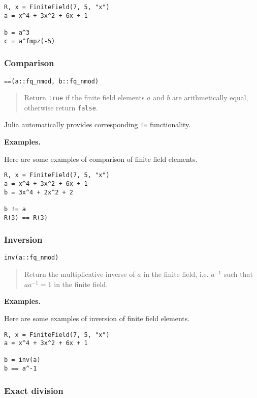 \documentclass[a4paper,10pt]{article}
\newcommand{\code}{\lstinline}
\newcommand{\desc}[1]{\vspace{-3mm}\begin{quote}#1\end{quote}}
\begin{document}
{{\begin{lstlisting}
R, x = FiniteField(7, 5, "x")
a = x^4 + 3x^2 + 6x + 1

b = a^3
c = a^fmpz(-5)
\end{lstlisting}

\subsubsection{Comparison}

\begin{lstlisting}
==(a::fq_nmod, b::fq_nmod)
\end{lstlisting}

\desc{Return \code{true} if the finite field elements $a$ and $b$ are 
arithmetically equal, otherwise return \code{false}.}

Julia automatically provides corresponding \code{!=} functionality.

\textbf{Examples.}

Here are some examples of comparison of finite field elements.

\begin{lstlisting}
R, x = FiniteField(7, 5, "x")
a = x^4 + 3x^2 + 6x + 1
b = 3x^4 + 2x^2 + 2

b != a
R(3) == R(3)
\end{lstlisting}

\subsubsection{Inversion}

\begin{lstlisting}
inv(a::fq_nmod)
\end{lstlisting}

\desc{Return the multiplicative inverse of $a$ in the finite field, i.e. 
$a^{-1}$ such that $aa^{-1} = 1$ in the finite field.}

\textbf{Examples.}

Here are some examples of inversion of finite field elements.

\begin{lstlisting}
R, x = FiniteField(7, 5, "x")
a = x^4 + 3x^2 + 6x + 1

b = inv(a)
b == a^-1
\end{lstlisting}

\subsubsection{Exact division}

}}
\end{document}
